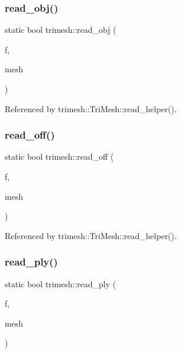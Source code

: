 \subsubsection{\texorpdfstring{read\+\_\+obj()}{read\_obj()}}
{\footnotesize\ttfamily static bool trimesh\+::read\+\_\+obj (\begin{DoxyParamCaption}\item[{F\+I\+LE $\ast$}]{f,  }\item[{\hyperlink{classtrimesh_1_1TriMesh}{Tri\+Mesh} $\ast$}]{mesh }\end{DoxyParamCaption})\hspace{0.3cm}{\ttfamily [static]}}



Referenced by trimesh\+::\+Tri\+Mesh\+::read\+\_\+helper().

\mbox{\label{namespacetrimesh_ace7124de1320b844bbf3f353f6dfab9a}} 
\subsubsection{\texorpdfstring{read\+\_\+off()}{read\_off()}}
{\footnotesize\ttfamily static bool trimesh\+::read\+\_\+off (\begin{DoxyParamCaption}\item[{F\+I\+LE $\ast$}]{f,  }\item[{\hyperlink{classtrimesh_1_1TriMesh}{Tri\+Mesh} $\ast$}]{mesh }\end{DoxyParamCaption})\hspace{0.3cm}{\ttfamily [static]}}



Referenced by trimesh\+::\+Tri\+Mesh\+::read\+\_\+helper().

\mbox{\label{namespacetrimesh_ad0cf7ab06d07c0569c9a7eb832ff114a}} 
\subsubsection{\texorpdfstring{read\+\_\+ply()}{read\_ply()}}
{\footnotesize\ttfamily static bool trimesh\+::read\+\_\+ply (\begin{DoxyParamCaption}\item[{F\+I\+LE $\ast$}]{f,  }\item[{\hyperlink{classtrimesh_1_1TriMesh}{Tri\+Mesh} $\ast$}]{mesh }\end{DoxyParamCaption})\hspace{0.3cm}{\ttfamily [static]}}



